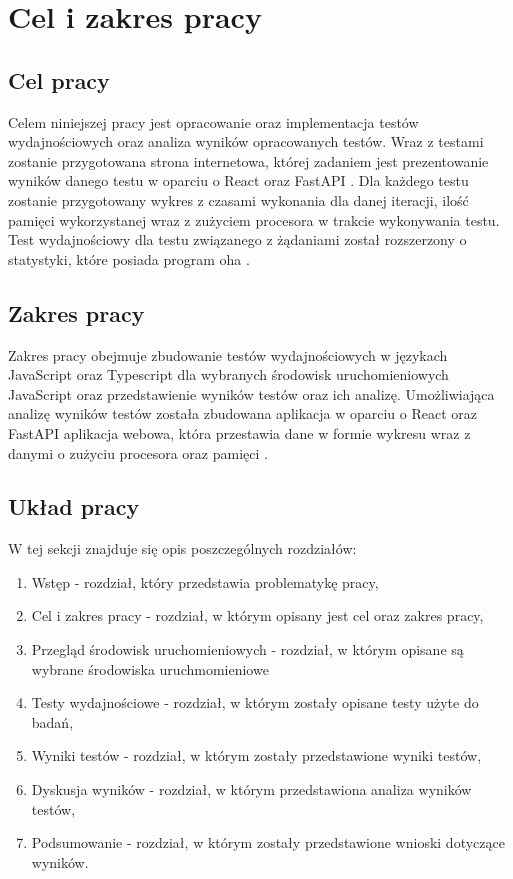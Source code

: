 \section*{Cel i zakres pracy}

\subsection*{Cel pracy}
Celem niniejszej pracy jest opracowanie oraz implementacja testów wydajnościowych oraz analiza wyników opracowanych testów. Wraz z testami zostanie przygotowana strona internetowa, której zadaniem jest prezentowanie wyników danego testu w oparciu o React \cite{React} oraz FastAPI \cite{FastAPI}. Dla każdego testu zostanie przygotowany wykres z czasami wykonania dla danej iteracji, ilość pamięci wykorzystanej wraz z zużyciem procesora w trakcie wykonywania testu. Test wydajnościowy dla testu związanego z żądaniami  został rozszerzony o statystyki, które posiada program oha \cite{oha}.

\subsection*{Zakres pracy}
Zakres pracy obejmuje zbudowanie testów wydajnościowych w językach JavaScript oraz Typescript dla wybranych środowisk uruchomieniowych JavaScript oraz przedstawienie wyników testów oraz ich analizę. Umożliwiająca analizę wyników testów została zbudowana aplikacja w oparciu o React \cite{React} oraz FastAPI \cite{FastAPI} aplikacja webowa, która przestawia dane w formie wykresu wraz z danymi o zużyciu procesora oraz pamięci .

\subsection*{Układ pracy}
W tej sekcji znajduje się opis poszczególnych rozdziałów:
\begin{enumerate}
  \item Wstęp - rozdział, który przedstawia problematykę pracy,
  \item Cel i zakres pracy - rozdział, w którym opisany jest cel oraz zakres pracy,
  \item Przegląd środowisk uruchomieniowych - rozdział, w którym opisane są wybrane środowiska uruchmomieniowe
  \item Testy wydajnościowe - rozdział, w którym zostały opisane testy użyte do badań,
  \item Wyniki testów - rozdział, w którym zostały przedstawione wyniki testów,
  \item Dyskusja wyników - rozdział, w którym przedstawiona analiza wyników testów, 
  \item Podsumowanie - rozdział, w którym zostały przedstawione wnioski dotyczące wyników.
\end{enumerate}